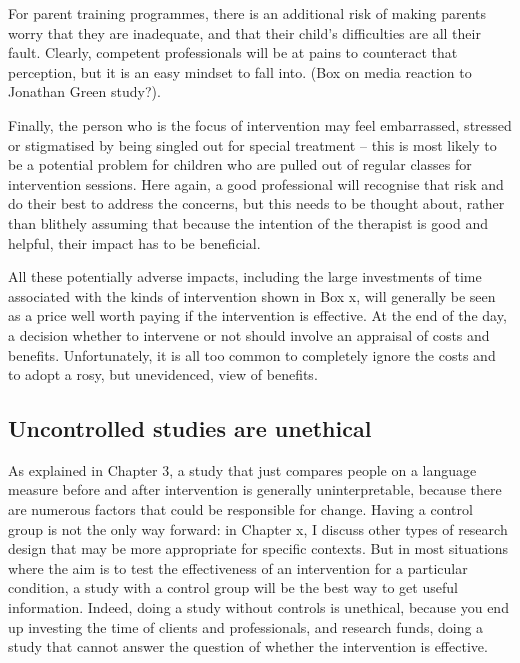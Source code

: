 \documentclass[]{book}
\begin{document}
For parent training programmes, there is an additional risk of making parents worry that they are inadequate, and that their child's difficulties are all their fault. Clearly, competent professionals will be at pains to counteract that perception, but it is an easy mindset to fall into. (Box on media reaction to Jonathan Green study?).

Finally, the person who is the focus of intervention may feel embarrassed, stressed or stigmatised by being singled out for special treatment -- this is most likely to be a potential problem for children who are pulled out of regular classes for intervention sessions. Here again, a good professional will recognise that risk and do their best to address the concerns, but this needs to be thought about, rather than blithely assuming that because the intention of the therapist is good and helpful, their impact has to be beneficial.

All these potentially adverse impacts, including the large investments of time associated with the kinds of intervention shown in Box x, will generally be seen as a price well worth paying if the intervention is effective. At the end of the day, a decision whether to intervene or not should involve an appraisal of costs and benefits. Unfortunately, it is all too common to completely ignore the costs and to adopt a rosy, but unevidenced, view of benefits.

\hypertarget{uncontrolled-studies-are-unethical}{%
\subsection{Uncontrolled studies are unethical}\label{uncontrolled-studies-are-unethical}}

As explained in Chapter 3, a study that just compares people on a language measure before and after intervention is generally uninterpretable, because there are numerous factors that could be responsible for change. Having a control group is not the only way forward: in Chapter x, I discuss other types of research design that may be more appropriate for specific contexts. But in most situations where the aim is to test the effectiveness of an intervention for a particular condition, a study with a control group will be the best way to get useful information. Indeed, doing a study without controls is unethical, because you end up investing the time of clients and professionals, and research funds, doing a study that cannot answer the question of whether the intervention is effective.
\end{document}

